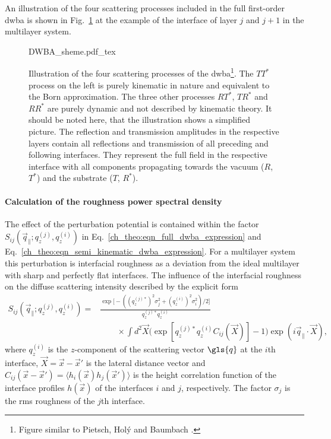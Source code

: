 An illustration of the four scattering processes included in the full first-order \gls{dwba} is shown in Fig.~\ref{ch_theo:fig_dwba_scheme} at the example of the interface of layer $j$ and $j+1$ in the multilayer system.
\begin{figure}[htb]
    \def\svgwidth{\textwidth}
    {DWBA_sheme.pdf_tex}
    \caption[Illustration of the four scattering processes of the DWBA.]{Illustration of the four scattering processes of the \gls{dwba}\footnote{Figure similar to Pietsch, Hol\'{y} and Baumbach \cite{pietsch_high-resolution_2004}.}. The $T T^*$ process on the left is purely kinematic in nature and equivalent to the Born approximation. The three other processes $RT^*$, $TR^*$ and $RR^*$ are purely dynamic and not described by kinematic theory. It should be noted here, that the illustration shows a simplified picture. The reflection and transmission amplitudes in the respective layers contain all reflections and transmission of all preceding and following interfaces. They represent the full field in the respective interface with all components propagating towards the vacuum ($R$, $T^*$) and the substrate ($T$, $R^*$).}
    \label{ch_theo:fig_dwba_scheme}
\end{figure}


\paragraph{Calculation of the roughness power spectral density}
The effect of the perturbation potential is contained within the factor $S_{ij}(\vec{q}_\parallel; q_z^{(j)}, q_z^{(i)})$ in Eq.~\eqref{ch_theo:eqn_full_dwba_expression} and Eq.~\eqref{ch_theo:eqn_semi_kinematic_dwba_expression}. For a multilayer system this perturbation is interfacial roughness as a deviation from the ideal multilayer with sharp and perfectly flat interfaces. The influence of the interfacial roughness on the diffuse scattering intensity described by the explicit form \cite{de_boer_x-ray_1995,de_boer_x-ray_1996}
\begin{align}
S_{ij}(\vec{q}_\parallel; q_z^{(j)}, q_z^{(i)}) = &\frac{\exp \Big[-((q_z^{(j)*})^{2} \sigma_j^2 + (q_z^{(i)})^{2} \sigma_i^2)/2\Big]}{q_z^{(j)*} q_z^{(i)}}  \nonumber \\
&\qquad \times \int d^2 \vec{X} \Big(\exp [q_z^{(j)*} q_z^{(i)} C_{ij}(\vec{X})]-1\Big) \exp(i \vec{q}_\parallel \cdot \vec{X}) \text{,} \label{ch_theo:eqn_full_dwba_roughness_factor}
\end{align}
where $q_z^{(i)}$ is the $z$-component of the scattering vector $\gls{q}$ at the $i$th interface, $\vec{X} = \vec{x} - \vec{x}'$ is the lateral distance vector and $C_{ij}(\vec{x}-\vec{x}') = \langle h_i(\vec{x}) h_j(\vec{x}') \rangle$ is the height correlation function of the interface profiles $h(\vec{x})$ of the interfaces $i$ and $j$, respectively. The factor $\sigma_j$ is the \gls{rms} roughness of the $j$th interface.


